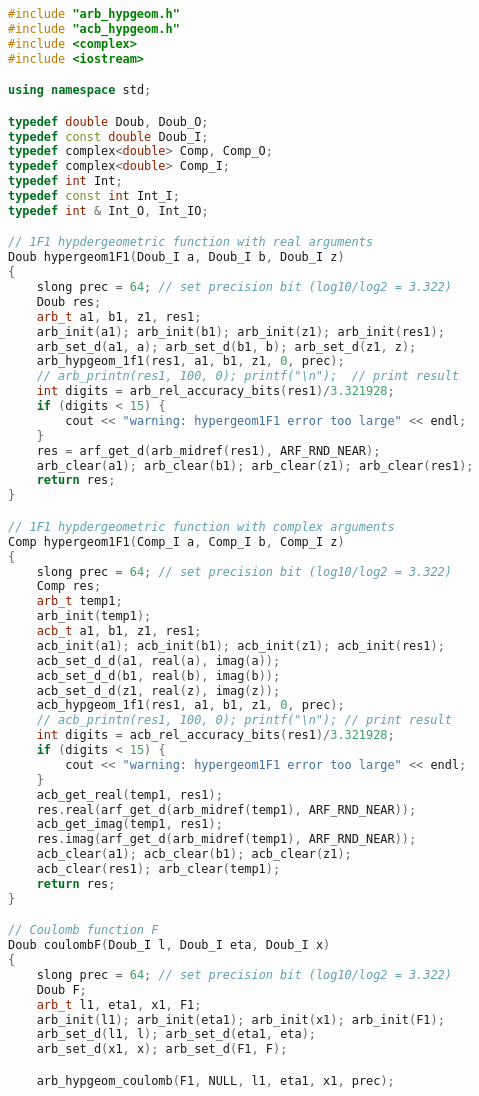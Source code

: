 \begin{lstlisting}[language=cpp, caption=test.cpp]
#include "arb_hypgeom.h"
#include "acb_hypgeom.h"
#include <complex>
#include <iostream>

using namespace std;

typedef double Doub, Doub_O;
typedef const double Doub_I;
typedef complex<double> Comp, Comp_O;
typedef complex<double> Comp_I;
typedef int Int;
typedef const int Int_I;
typedef int & Int_O, Int_IO;

// 1F1 hypdergeometric function with real arguments
Doub hypergeom1F1(Doub_I a, Doub_I b, Doub_I z)
{
	slong prec = 64; // set precision bit (log10/log2 = 3.322)
	Doub res;
	arb_t a1, b1, z1, res1;
	arb_init(a1); arb_init(b1); arb_init(z1); arb_init(res1);
	arb_set_d(a1, a); arb_set_d(b1, b);	arb_set_d(z1, z);
	arb_hypgeom_1f1(res1, a1, b1, z1, 0, prec);
	// arb_printn(res1, 100, 0); printf("\n");  // print result
	int digits = arb_rel_accuracy_bits(res1)/3.321928;
	if (digits < 15) {
		cout << "warning: hypergeom1F1 error too large" << endl;
	}
	res = arf_get_d(arb_midref(res1), ARF_RND_NEAR);
	arb_clear(a1); arb_clear(b1); arb_clear(z1); arb_clear(res1);
	return res;
}

// 1F1 hypdergeometric function with complex arguments
Comp hypergeom1F1(Comp_I a, Comp_I b, Comp_I z)
{
	slong prec = 64; // set precision bit (log10/log2 = 3.322)
	Comp res;
	arb_t temp1;
	arb_init(temp1);
	acb_t a1, b1, z1, res1;
	acb_init(a1); acb_init(b1); acb_init(z1); acb_init(res1);
	acb_set_d_d(a1, real(a), imag(a));
	acb_set_d_d(b1, real(b), imag(b));
	acb_set_d_d(z1, real(z), imag(z));
	acb_hypgeom_1f1(res1, a1, b1, z1, 0, prec);
	// acb_printn(res1, 100, 0); printf("\n"); // print result
	int digits = acb_rel_accuracy_bits(res1)/3.321928;
	if (digits < 15) {
		cout << "warning: hypergeom1F1 error too large" << endl;
	}
	acb_get_real(temp1, res1);
	res.real(arf_get_d(arb_midref(temp1), ARF_RND_NEAR));
	acb_get_imag(temp1, res1);
	res.imag(arf_get_d(arb_midref(temp1), ARF_RND_NEAR));
	acb_clear(a1); acb_clear(b1); acb_clear(z1);
    acb_clear(res1); arb_clear(temp1);
	return res;
}

// Coulomb function F
Doub coulombF(Doub_I l, Doub_I eta, Doub_I x)
{
	slong prec = 64; // set precision bit (log10/log2 = 3.322)
	Doub F;
	arb_t l1, eta1, x1, F1;
	arb_init(l1); arb_init(eta1); arb_init(x1); arb_init(F1);
	arb_set_d(l1, l); arb_set_d(eta1, eta);
	arb_set_d(x1, x); arb_set_d(F1, F);

	arb_hypgeom_coulomb(F1, NULL, l1, eta1, x1, prec);
	

\end{lstlisting}

